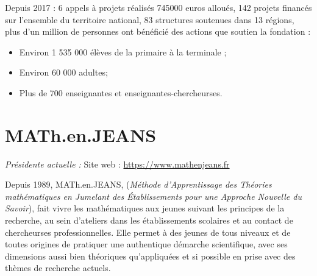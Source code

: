 Depuis 2017 : 6 appels \`a projets r\'ealis\'es 745000 euros allou\'es, 142 projets financ\'es sur l’ensemble du territoire national, 83 structures soutenues dans 13 r\'egions, plus d’un million de personnes ont b\'en\'efici\'e des actions que soutien la fondation :
\begin{itemize}
\item Environ 1 535 000 \'el\`eves de la primaire \`a la terminale ;
\item Environ 60 000 adultes;
\item Plus de 700 enseignant\mp e\mp s et enseignant\mp e\mp s-chercheur\mp ses.
\end{itemize}


%
%
%
%


\section{MATh.en.JEANS}

\emph{Pr\'esident\mp e actuel\mp le : }\hfill Site web : \url{https://www.mathenjeans.fr}
\smallskip

Depuis 1989, MATh.en.JEANS, ({\em M\'ethode d'Apprentissage des Th\'eories math\'ematiques en Jumelant des \'Etablissements pour une Approche Nouvelle du Savoir}), fait vivre les math\'ematiques aux jeunes suivant les principes de la recherche, au sein d'ateliers dans les \'etablissements scolaires et au contact de chercheur\mp ses professionnel\mp les. Elle permet \`a des jeunes  de tous niveaux et de toutes origines de pratiquer une authentique d\'emarche scientifique, avec ses dimensions aussi bien th\'eoriques qu'appliqu\'ees et si possible en prise avec des th\`emes de recherche actuels.

